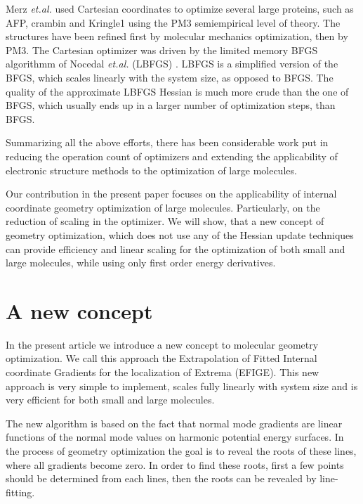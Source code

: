 \documentclass[prl,twocolumn,showpacs,twocolumngrid,superbib]{revtex4}
\begin{document}
Merz {\it et.al.} used Cartesian coordinates to optimize several large 
proteins, such as AFP, crambin and Kringle1 \cite{merz_divc_geomopt} using
the PM3 semiempirical level of theory.
The structures have been refined first by molecular mechanics optimization,
then by PM3. The Cartesian optimizer was driven by
the limited memory BFGS algorithmm of Nocedal {\it et.al.} (LBFGS) 
\cite{nocedal_lbgs}. LBFGS is a simplified version of the BFGS, which scales
linearly with the system size, as opposed to BFGS. The quality of the 
approximate LBFGS Hessian is much more crude than the one of BFGS, which 
usually ends up in a larger number of optimization steps, than BFGS.

Summarizing all the above efforts, there has been considerable work
put in reducing the operation count of optimizers and extending the 
applicability of electronic structure methods to the optimization of
large molecules.

Our contribution in the present paper focuses on the applicability of
internal coordinate geometry optimization of large molecules. Particularly,
on the reduction of scaling in the optimizer. We will show, that a new
concept of geometry optimization, which does not use any of the Hessian update
techniques can provide efficiency and linear scaling for the optimization
of both small and large molecules, while using only first order energy 
derivatives.

\section{A new concept}

In the present article we introduce a new concept 
to molecular geometry optimization. We call this approach the
Extrapolation of Fitted Internal coordinate
Gradients for the localization of Extrema (EFIGE).
This new approach is very simple to implement, scales fully linearly with system size 
and is very efficient for both small and large molecules.

The new algorithm is based on the fact that
normal mode gradients are linear functions of the normal mode values 
on harmonic potential energy surfaces. 
In the process of geometry optimization the goal is to reveal the roots
of these lines, where all gradients become zero. In order to 
find these roots, first a few points should be determined from each
lines, then the roots can be revealed by line-fitting. 
\end{document}
